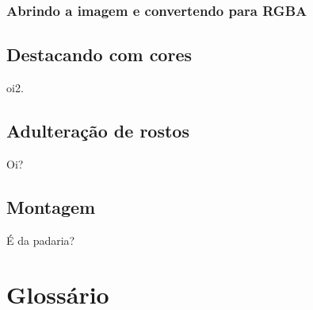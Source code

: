 \documentclass[12pt,onecolumn]{article}
\begin{document}
    \subsubsection{Abrindo a imagem e convertendo para RGBA}
    

  \subsection{Destacando com cores}
    oi2.

  \subsection{Adulteração de rostos}
    Oi?

  \subsection{Montagem}
    É da padaria?

\section{Glossário}
\end{document}
